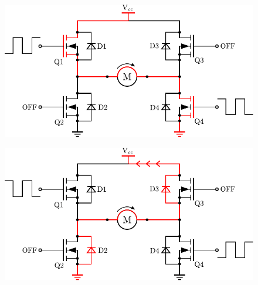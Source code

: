   \begin{minipage}{\linewidth}
  	\begin{minipage}{0.45\linewidth}
  		\begin{figure}[H]
  			\includegraphics[scale=.6]{figures/HbridgeClockwiseCoastON.pdf}
  			\centering
  			\vspace{-.4cm}
  			\captionsetup{justification=centering}
  			\label{HbridgeClockwiseCoastON}
  		\end{figure}\vspace{-5mm}
  	\end{minipage}
  	\hspace{0.03\linewidth}
  	\begin{minipage}{0.45\linewidth}
  		\begin{figure}[H]
  			\includegraphics[scale=.6]{figures/HbridgeClockwiseCoastRegen.pdf}
  			\centering
  			\vspace{-.4cm}
  			\captionsetup{justification=centering}
  			\label{HbridgeClokwiseCoastRegen}
  		\end{figure}\vspace{-5mm}
  	\end{minipage}
  \end{minipage}

